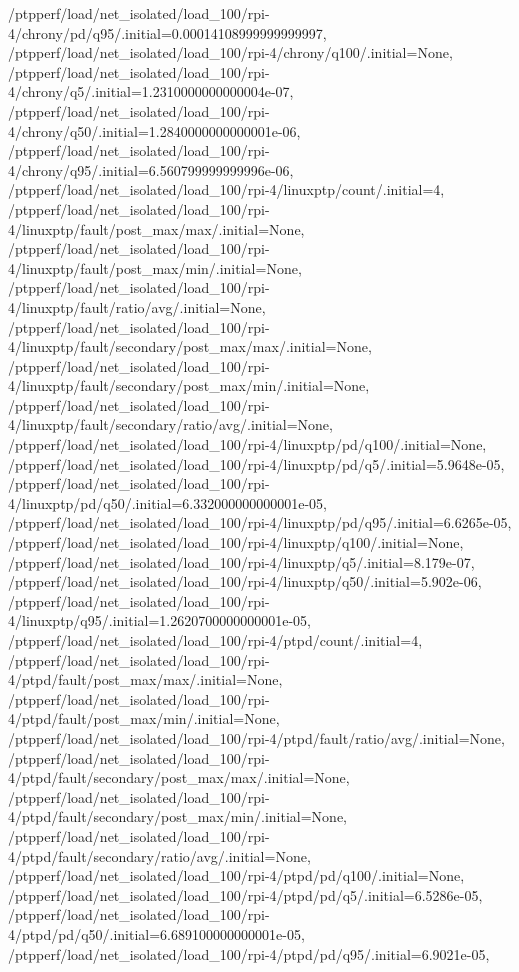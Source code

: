 {    /ptpperf/load/net_isolated/load_100/rpi-4/chrony/pd/q95/.initial=0.00014108999999999997,
    /ptpperf/load/net_isolated/load_100/rpi-4/chrony/q100/.initial=None,
    /ptpperf/load/net_isolated/load_100/rpi-4/chrony/q5/.initial=1.2310000000000004e-07,
    /ptpperf/load/net_isolated/load_100/rpi-4/chrony/q50/.initial=1.2840000000000001e-06,
    /ptpperf/load/net_isolated/load_100/rpi-4/chrony/q95/.initial=6.560799999999996e-06,
    /ptpperf/load/net_isolated/load_100/rpi-4/linuxptp/count/.initial=4,
    /ptpperf/load/net_isolated/load_100/rpi-4/linuxptp/fault/post_max/max/.initial=None,
    /ptpperf/load/net_isolated/load_100/rpi-4/linuxptp/fault/post_max/min/.initial=None,
    /ptpperf/load/net_isolated/load_100/rpi-4/linuxptp/fault/ratio/avg/.initial=None,
    /ptpperf/load/net_isolated/load_100/rpi-4/linuxptp/fault/secondary/post_max/max/.initial=None,
    /ptpperf/load/net_isolated/load_100/rpi-4/linuxptp/fault/secondary/post_max/min/.initial=None,
    /ptpperf/load/net_isolated/load_100/rpi-4/linuxptp/fault/secondary/ratio/avg/.initial=None,
    /ptpperf/load/net_isolated/load_100/rpi-4/linuxptp/pd/q100/.initial=None,
    /ptpperf/load/net_isolated/load_100/rpi-4/linuxptp/pd/q5/.initial=5.9648e-05,
    /ptpperf/load/net_isolated/load_100/rpi-4/linuxptp/pd/q50/.initial=6.332000000000001e-05,
    /ptpperf/load/net_isolated/load_100/rpi-4/linuxptp/pd/q95/.initial=6.6265e-05,
    /ptpperf/load/net_isolated/load_100/rpi-4/linuxptp/q100/.initial=None,
    /ptpperf/load/net_isolated/load_100/rpi-4/linuxptp/q5/.initial=8.179e-07,
    /ptpperf/load/net_isolated/load_100/rpi-4/linuxptp/q50/.initial=5.902e-06,
    /ptpperf/load/net_isolated/load_100/rpi-4/linuxptp/q95/.initial=1.2620700000000001e-05,
    /ptpperf/load/net_isolated/load_100/rpi-4/ptpd/count/.initial=4,
    /ptpperf/load/net_isolated/load_100/rpi-4/ptpd/fault/post_max/max/.initial=None,
    /ptpperf/load/net_isolated/load_100/rpi-4/ptpd/fault/post_max/min/.initial=None,
    /ptpperf/load/net_isolated/load_100/rpi-4/ptpd/fault/ratio/avg/.initial=None,
    /ptpperf/load/net_isolated/load_100/rpi-4/ptpd/fault/secondary/post_max/max/.initial=None,
    /ptpperf/load/net_isolated/load_100/rpi-4/ptpd/fault/secondary/post_max/min/.initial=None,
    /ptpperf/load/net_isolated/load_100/rpi-4/ptpd/fault/secondary/ratio/avg/.initial=None,
    /ptpperf/load/net_isolated/load_100/rpi-4/ptpd/pd/q100/.initial=None,
    /ptpperf/load/net_isolated/load_100/rpi-4/ptpd/pd/q5/.initial=6.5286e-05,
    /ptpperf/load/net_isolated/load_100/rpi-4/ptpd/pd/q50/.initial=6.689100000000001e-05,
    /ptpperf/load/net_isolated/load_100/rpi-4/ptpd/pd/q95/.initial=6.9021e-05,
}
